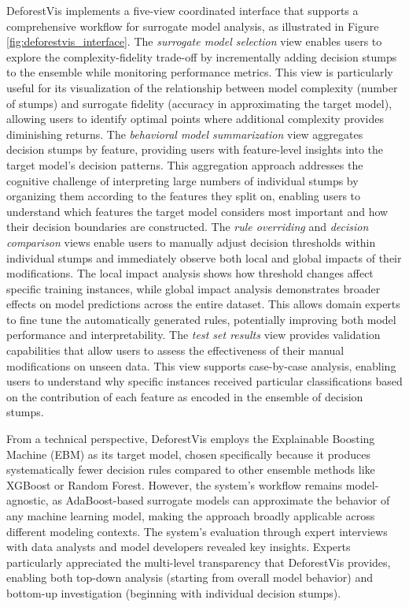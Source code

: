 DeforestVis implements a five-view coordinated interface that supports a comprehensive workflow for surrogate model analysis, as illustrated in Figure \ref{fig:deforestvis_interface}. The \textit{surrogate model selection} view enables users to explore the complexity-fidelity trade-off by incrementally adding decision stumps to the ensemble while monitoring performance metrics. This view is particularly useful for its visualization of the relationship between model complexity (number of stumps) and surrogate fidelity (accuracy in approximating the target model), allowing users to identify optimal points where additional complexity provides diminishing returns.
The \textit{behavioral model summarization} view aggregates decision stumps by feature, providing users with feature-level insights into the target model's decision patterns. This aggregation approach addresses the cognitive challenge of interpreting large numbers of individual stumps by organizing them according to the features they split on, enabling users to understand which features the target model considers most important and how their decision boundaries are constructed.
The \textit{rule overriding} and \textit{decision comparison} views enable users to manually adjust decision thresholds within individual stumps and immediately observe both local and global impacts of their modifications. The local impact analysis shows how threshold changes affect specific training instances, while global impact analysis demonstrates broader effects on model predictions across the entire dataset. This allows domain experts to fine tune the automatically generated rules, potentially improving both model performance and interpretability.
The \textit{test set results} view provides validation capabilities that allow users to assess the effectiveness of their manual modifications on unseen data. This view supports case-by-case analysis, enabling users to understand why specific instances received particular classifications based on the contribution of each feature as encoded in the ensemble of decision stumps.

From a technical perspective, DeforestVis employs the Explainable Boosting Machine (EBM) as its target model, chosen specifically because it produces systematically fewer decision rules compared to other ensemble methods like XGBoost or Random Forest. However, the system's workflow remains model-agnostic, as AdaBoost-based surrogate models can approximate the behavior of any machine learning model, making the approach broadly applicable across different modeling contexts.
The system's evaluation through expert interviews with data analysts and model developers revealed key insights. Experts particularly appreciated the multi-level transparency that DeforestVis provides, enabling both top-down analysis (starting from overall model behavior) and bottom-up investigation (beginning with individual decision stumps). 
